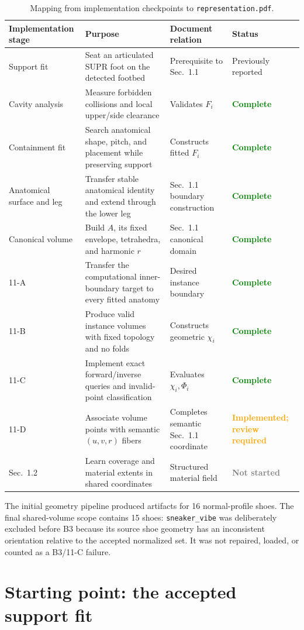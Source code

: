 \documentclass[11pt]{article}
\newcommand{\done}{\textcolor{green}{\textbf{Complete}}}
\newcommand{\inaudit}{\textcolor{orange}{\textbf{Implemented; review required}}}
\newcommand{\notstarted}{\textcolor{graytext}{\textbf{Not started}}}
\begin{document}
\begin{table}[H]
\centering
\small
\begin{tabularx}{\textwidth}{@{}p{}X p{}p{}@{}}
\toprule
\textbf{Implementation stage} & \textbf{Purpose} & \textbf{Document relation} & \textbf{Status}\\
\midrule
Support fit & Seat an articulated SUPR foot on the detected footbed & Prerequisite to Sec.~1.1 & Previously reported\\
Cavity analysis & Measure forbidden collisions and local upper/side clearance & Validates $F_i$ & \done\\
Containment fit & Search anatomical shape, pitch, and placement while preserving support & Constructs fitted $F_i$ & \done\\
Anatomical surface and leg & Transfer stable anatomical identity and extend through the lower leg & Sec.~1.1 boundary construction & \done\\
Canonical volume & Build $A$, its fixed envelope, tetrahedra, and harmonic $r$ & Sec.~1.1 canonical domain & \done\\
11-A & Transfer the computational inner-boundary target to every fitted anatomy & Desired instance boundary & \done\\
11-B & Produce valid instance volumes with fixed topology and no folds & Constructs geometric $\chi_i$ & \done\\
11-C & Implement exact forward/inverse queries and invalid-point classification & Evaluates $\chi_i,\Phi_i$ & \done\\
11-D & Associate volume points with semantic $(u,v,r)$ fibers & Completes semantic Sec.~1.1 coordinate & \inaudit\\
Sec.~1.2 & Learn coverage and material extents in shared coordinates & Structured material field & \notstarted\\
\bottomrule
\end{tabularx}
\caption{Mapping from implementation checkpoints to \texttt{representation.pdf}.}
\end{table}

The initial geometry pipeline produced artifacts for 16 normal-profile shoes. The final
shared-volume scope contains 15 shoes: \texttt{sneaker\_vibe} was deliberately excluded
before B3 because its source shoe geometry has an inconsistent orientation relative to
the accepted normalized set. It was not repaired, loaded, or counted as a B3/11-C
failure.

\section{Starting point: the accepted support fit}
\end{document}
